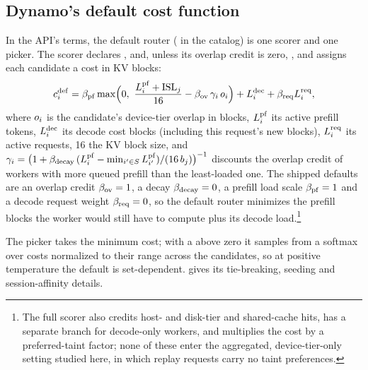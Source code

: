 \subsection{Dynamo's default cost function}
\label{sec:default-cost}

In the API's terms, the default router ( in the catalog) is one scorer and one picker.
The scorer declares ,  and, unless its overlap credit is zero,
, and assigns each candidate a cost in KV blocks:
\begin{equation}
  \label{eq:default-cost}
  c^{\mathrm{def}}_i = \beta_{\mathrm{pf}} \max\!\Big(0,\ \frac{L^{\mathrm{pf}}_i + \mathrm{ISL}_j}{16} - \beta_{\mathrm{ov}}\,\gamma_i\,o_i\Big)
           + L^{\mathrm{dec}}_i + \beta_{\mathrm{req}} L^{\mathrm{req}}_i,
\end{equation}
where $o_i$ is the candidate's device-tier overlap in blocks, $L^{\mathrm{pf}}_i$ its active prefill tokens,
$L^{\mathrm{dec}}_i$ its decode cost blocks (including this request's new blocks), $L^{\mathrm{req}}_i$ its active
requests, 16 the KV block size, and
\(
  \gamma_i = \big(1 + \beta_{\mathrm{decay}}\,(L^{\mathrm{pf}}_i - \min_{i' \in S}L^{\mathrm{pf}}_{i'})/(16\,b_j)\big)^{-1}
\)
discounts the overlap credit of workers with more queued prefill than the least-loaded one. The
shipped defaults are an overlap credit $\beta_{\mathrm{ov}} = 1$, a decay $\beta_{\mathrm{decay}} = 0$, a prefill load scale
$\beta_{\mathrm{pf}} = 1$ and a decode request weight $\beta_{\mathrm{req}} = 0$, so the default router minimizes the prefill
blocks the worker would still have to compute plus its decode load.\footnote{The full scorer also
  credits host- and disk-tier and shared-cache hits, has a separate branch for decode-only workers,
  and multiplies the cost by a preferred-taint factor; none of these enter the aggregated,
  device-tier-only setting studied here, in which replay requests carry no taint preferences.}

The picker takes the minimum cost; with a  above zero it samples from a
softmax over costs normalized to their range across the candidates, so at positive temperature the
default is set-dependent.  gives its tie-breaking, seeding and session-affinity
details.

